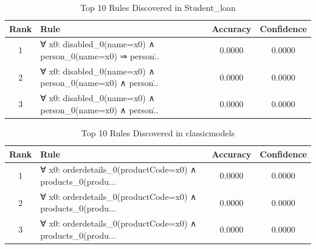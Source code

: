 \documentclass[11pt,a4paper]{article}
\begin{document}
\begin{table}[h!]
\centering
\small
\caption{Top 10 Rules Discovered in Student_loan}
\label{tab:rules_Studentloan}
\begin{tabular}{|c|p{5cm}|c|c|}
\hline
\textbf{Rank} & \textbf{Rule} & \textbf{Accuracy} & \textbf{Confidence} \\
\hline
1 & ∀ x0: disabled\_0(name=x0) ∧ person\_0(name=x0) ⇒ person\... & 0.0000 & 0.0000 \\
2 & ∀ x0: disabled\_0(name=x0) ∧ person\_0(name=x0) ∧ person\... & 0.0000 & 0.0000 \\
3 & ∀ x0: disabled\_0(name=x0) ∧ person\_0(name=x0) ∧ person\... & 0.0000 & 0.0000 \\
\hline
\end{tabular}
\end{table}

\begin{table}[h!]
\centering
\small
\caption{Top 10 Rules Discovered in classicmodels}
\label{tab:rules_classicmodels}
\begin{tabular}{|c|p{5cm}|c|c|}
\hline
\textbf{Rank} & \textbf{Rule} & \textbf{Accuracy} & \textbf{Confidence} \\
\hline
1 & ∀ x0: orderdetails\_0(productCode=x0) ∧ products\_0(produ... & 0.0000 & 0.0000 \\
2 & ∀ x0: orderdetails\_0(productCode=x0) ∧ products\_0(produ... & 0.0000 & 0.0000 \\
3 & ∀ x0: orderdetails\_0(productCode=x0) ∧ products\_0(produ... & 0.0000 & 0.0000 \\
\hline
\end{tabular}
\end{table}
\end{document}
